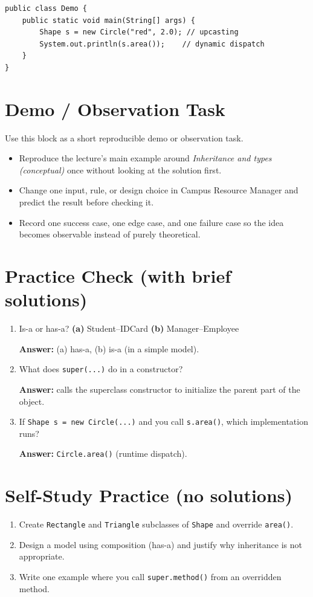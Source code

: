 \documentclass[11pt]{article}
\begin{document}
\begin{lstlisting}
public class Demo {
    public static void main(String[] args) {
        Shape s = new Circle("red", 2.0); // upcasting
        System.out.println(s.area());    // dynamic dispatch
    }
}
\end{lstlisting}

\section{Demo / Observation Task}
Use this block as a short reproducible demo or observation task.
\begin{itemize}
  \item Reproduce the lecture's main example around \textit{Inheritance and types (conceptual)} once without looking at the solution first.
  \item Change one input, rule, or design choice in Campus Resource Manager and predict the result before checking it.
  \item Record one success case, one edge case, and one failure case so the idea becomes observable instead of purely theoretical.
\end{itemize}
\notesources{\OOPSUnitIISources}

\section{Practice Check (with brief solutions)}
\begin{enumerate}
  \item Is-a or has-a?\; \textbf{(a)} Student--IDCard \textbf{(b)} Manager--Employee\par
  \textbf{Answer:} (a) has-a, (b) is-a (in a simple model).

  \item What does \texttt{super(...)} do in a constructor?\par
  \textbf{Answer:} calls the superclass constructor to initialize the parent part of the object.

  \item If \texttt{Shape s = new Circle(...)} and you call \texttt{s.area()}, which implementation runs?\par
  \textbf{Answer:} \texttt{Circle.area()} (runtime dispatch).
\end{enumerate}

\section{Self-Study Practice (no solutions)}
\begin{enumerate}
  \item Create \texttt{Rectangle} and \texttt{Triangle} subclasses of \texttt{Shape} and override \texttt{area()}.
  \item Design a model using composition (has-a) and justify why inheritance is not appropriate.
  \item Write one example where you call \texttt{super.method()} from an overridden method.
\end{enumerate}
\end{document}
